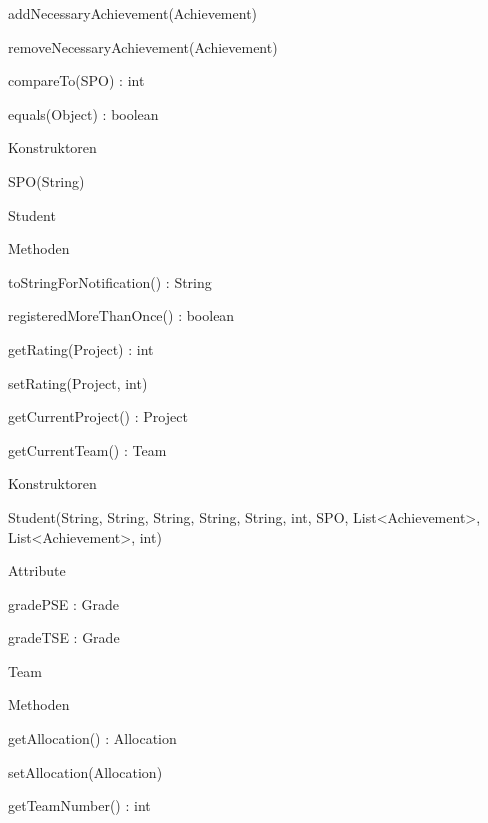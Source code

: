 \documentclass[parskip=full]{scrartcl}
\begin{document}
\begin{itemPackage}
\begin{itemClass}
\begin{itemClassSub}
\begin{itemPlus}
\item addNecessaryAchievement(Achievement)
\item removeNecessaryAchievement(Achievement)
\item compareTo(SPO) : int
\item equals(Object) : boolean
\end{itemPlus}
\item Konstruktoren
\begin{itemPlus}
\item SPO(String)
\end{itemPlus}
\end{itemClassSub}
\item Student
\begin{itemClassSub}
\item Methoden
\begin{itemPlus}
\item toStringForNotification() : String
\item registeredMoreThanOnce() : boolean
\end{itemPlus}
\begin{itemMinus}
\item getRating(Project) : int
\item setRating(Project, int)
\item getCurrentProject() : Project
\item getCurrentTeam() : Team
\end{itemMinus}
\item Konstruktoren
\begin{itemPlus}
\item Student(String, String, String, String, String, int, SPO,
List<Achievement>, List<Achievement>, int)
\end{itemPlus}
\item Attribute 
\begin{itemChange}
\item gradePSE : Grade
\item gradeTSE : Grade
\end{itemChange}
\end{itemClassSub}
\item Team
\begin{itemClassSub}
\item Methoden
\begin{itemPlus}
\item getAllocation() : Allocation
\item setAllocation(Allocation)
\item getTeamNumber() : int

\end{itemPlus}
\end{itemClassSub}
\end{itemClass}
\end{itemPackage}
\end{document}
